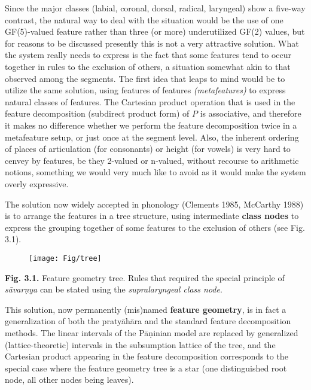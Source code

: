 Since the major classes (labial, coronal, dorsal, radical, laryngeal) show a
five-way contrast, the natural way to deal with the situation would be the use
of one GF(5)-valued feature rather than three (or more) underutilized GF(2)
values, but for reasons to be discussed presently this is not a very
attractive solution. What the system really needs to express is the fact that
some features tend to occur together in rules to the exclusion of others, a
situation somewhat akin to that observed among the segments. The first idea
that leaps to mind would be to utilize the same solution, using features of
features {\it (metafeatures)} to express natural classes of features. The
Cartesian product operation that is used in the feature decomposition
(subdirect product form) of $P$ is associative, and therefore it makes no
difference whether we perform the feature decomposition twice in a metafeature
setup, or just once at the segment level. Also, the inherent ordering of
places of articulation (for consonants) or height (for vowels) is very hard to
cenvey by features, be they 2-valued or n-valued, without recourse to
arithmetic notions, something we would very much like to avoid as it would
make the system overly expressive. 

The solution now widely accepted in phonology (Clements 1985, McCarthy 1988)
\nocite{Clements:1985,McCarthy:1988} is to arrange the features in a tree
structure, using intermediate {\bf class nodes} 
 to express the grouping together of some features to
the exclusion of others (see Fig. 3.1).

\begin{figure}[h]
\begin{center}
\texttt{[image: Fig/tree]}
\end{center}
\end{figure}

\begin{center}
{\bf Fig. 3.1.} Feature geometry tree. Rules that required the special
principle of {\it s\={a}var\d{n}ya} can be stated using the {\it
supralaryngeal class node}. 
\end{center}

\smallskip\noindent This solution, now permanently (mis)named {\bf feature
geometry}, is in fact a generalization of both the praty\={a}h\={a}ra and the
standard feature decomposition methods. The linear intervals of the
P\={a}\d{n}inian model are replaced by generalized (lattice-theoretic)
intervals in the subsumption lattice of the tree, and the Cartesian product
appearing in the feature decomposition corresponds to the special case where
the feature geometry tree is a star (one distinguished root node, all other
nodes being leaves). 

